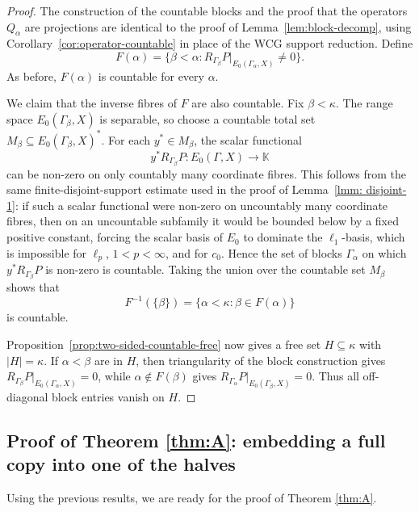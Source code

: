 \documentclass[11pt]{amsart}
\theoremstyle{plain}
\theoremstyle{definition}
\numberwithin{equation}{section}
\newcommand{\abs}[1]{\left|#1\right|}
\begin{document}
\begin{proof}
The construction of the countable blocks and the proof that the operators
$Q_\alpha$ are projections are identical to the proof of Lemma~\ref{lem:block-decomp},
using Corollary~\ref{cor:operator-countable} in place of the WCG support
reduction.  Define
\[
    F(\alpha)=\{\beta<\alpha:
    R_{\Gamma_\beta}P|_{E_0(\Gamma_\alpha,X)}\neq0\}.
\]
As before, $F(\alpha)$ is countable for every $\alpha$.

We claim that the inverse fibres of $F$ are also countable.  Fix $\beta<\kappa$.
The range space $E_0(\Gamma_\beta,X)$ is separable, so choose a countable total
set $M_\beta\subseteq E_0(\Gamma_\beta,X)^*$.  For each
$y^*\in M_\beta$, the scalar functional
\[
    y^*R_{\Gamma_\beta}P\colon E_0(\Gamma,X)\to\mathbb K
\]
can be non-zero on only countably many coordinate fibres.  This follows from the same finite-disjoint-support estimate used in the proof
of Lemma~\ref{lmm: disjoint-1}: if such a scalar functional were non-zero on
uncountably many coordinate fibres, then on an uncountable subfamily it would be
bounded below by a fixed positive constant, forcing the scalar basis of $E_0$ to
dominate the $\ell_1$-basis, which is impossible for $\ell_p$, $1<p<\infty$, and
for $c_0$.  Hence the set of blocks $\Gamma_\alpha$ on which
$y^*R_{\Gamma_\beta}P$ is non-zero is countable.  Taking the union over the
countable set $M_\beta$ shows that
\[
    F^{-1}(\{\beta\})
    =\{\alpha<\kappa:\beta\in F(\alpha)\}
\]
is countable.

Proposition~\ref{prop:two-sided-countable-free} now gives a free set
$H\subseteq\kappa$ with $\abs H=\kappa$.  If $\alpha<\beta$ are in $H$, then
triangularity of the block construction gives
$R_{\Gamma_\beta}P|_{E_0(\Gamma_\alpha,X)}=0$, while
$\alpha\notin F(\beta)$ gives
$R_{\Gamma_\alpha}P|_{E_0(\Gamma_\beta,X)}=0$.  Thus all off-diagonal block
entries vanish on $H$.
\end{proof}


\subsection{Proof of Theorem \ref{thm:A}: embedding a full copy into one of the halves}\label{sec:main-proof}

Using the previous results, we are ready for the proof of Theorem \ref{thm:A}.
\end{document}
